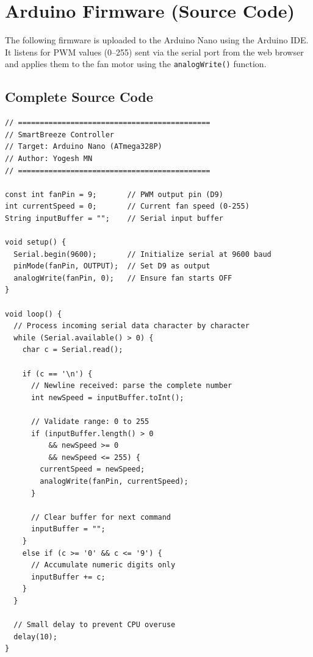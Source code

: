 \documentclass[12pt,a4paper]{article}
\begin{document}
\newpage

\section{Arduino Firmware (Source Code)}

The following firmware is uploaded to the Arduino Nano using the Arduino IDE. It listens for PWM values (0--255) sent via the serial port from the web browser and applies them to the fan motor using the \texttt{analogWrite()} function.

\subsection{Complete Source Code}

\begin{lstlisting}[style=arduinoStyle, caption={SmartBreeze -- Arduino Nano Firmware}, label={lst:arduino}]
// ============================================
// SmartBreeze Controller
// Target: Arduino Nano (ATmega328P)
// Author: Yogesh MN
// ============================================

const int fanPin = 9;       // PWM output pin (D9)
int currentSpeed = 0;       // Current fan speed (0-255)
String inputBuffer = "";    // Serial input buffer

void setup() {
  Serial.begin(9600);       // Initialize serial at 9600 baud
  pinMode(fanPin, OUTPUT);  // Set D9 as output
  analogWrite(fanPin, 0);   // Ensure fan starts OFF
}

void loop() {
  // Process incoming serial data character by character
  while (Serial.available() > 0) {
    char c = Serial.read();
    
    if (c == '\n') {
      // Newline received: parse the complete number
      int newSpeed = inputBuffer.toInt();
      
      // Validate range: 0 to 255
      if (inputBuffer.length() > 0 
          && newSpeed >= 0 
          && newSpeed <= 255) {
        currentSpeed = newSpeed;
        analogWrite(fanPin, currentSpeed);
      }
      
      // Clear buffer for next command
      inputBuffer = "";
    } 
    else if (c >= '0' && c <= '9') {
      // Accumulate numeric digits only
      inputBuffer += c;
    }
  }
  
  // Small delay to prevent CPU overuse
  delay(10);
}
\end{lstlisting}
\end{document}
